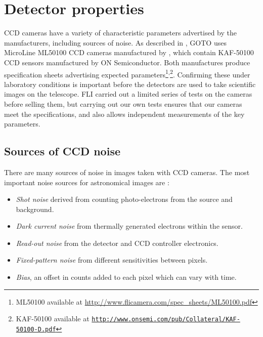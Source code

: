 \section{Detector properties}
\label{sec:detectors}
\begin{colsection}


\begin{colsection}

CCD cameras have a variety of characteristic parameters advertised by the manufacturers, including sources of noise. As described in , GOTO uses MicroLine ML50100 CCD cameras manufactured by , which contain KAF-50100 CCD sensors manufactured by ON Semiconductor. Both manufactures produce specification sheets advertising expected parameters\footnote{ML50100 available at \url{http://www.flicamera.com/spec_sheets/ML50100.pdf}}\textsuperscript{,}\footnote{KAF-50100 available at \href{http://www.onsemi.com/pub/Collateral/KAF-50100-D.PDF}{\texttt{http://www.onsemi.com/pub/Collateral/KAF-50100-D.pdf}}}. Confirming these under laboratory conditions is important before the detectors are used to take scientific images on the telescope. FLI carried out a limited series of tests on the cameras before selling them, but carrying out our own tests ensures that our cameras meet the specifications, and also allows independent measurements of the key parameters.

\end{colsection}

\subsection{Sources of CCD noise}
\label{sec:noise}
\begin{colsection}

There are many sources of noise in images taken with CCD cameras. The most important noise sources for astronomical images are \citep{CCDs}:
%
\begin{itemize}
    \item \emph{Shot noise} derived from counting photo-electrons from the source and background.
    \item \emph{Dark current noise} from thermally generated electrons within the sensor.
    \item \emph{Read-out noise} from the detector and CCD controller electronics.
    \item \emph{Fixed-pattern noise} from different sensitivities between pixels.
    \item \emph{Bias}, an offset in counts added to each pixel which can vary with time.
\end{itemize}


\end{colsection}
\end{colsection}

